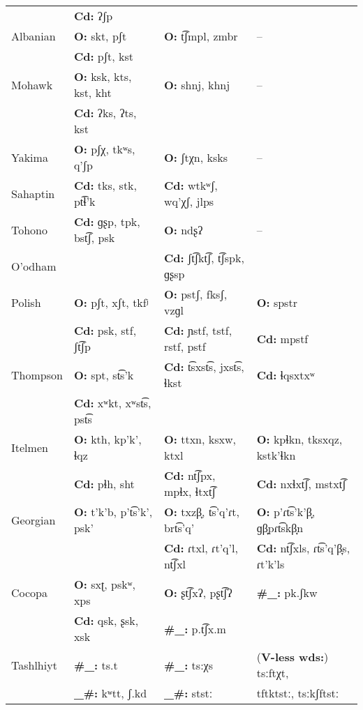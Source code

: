 {\begin{longtable}{llll}
            & \textbf{Cd:} ʔʃp\\
{Albanian} & \textbf{O:} skt, pʃt & \textbf{O:} t͡ʃmpl, zmbr & --\\
            & \textbf{Cd:} pʃt, kst  \\
{Mohawk} & \textbf{O:} ksk, kts, kst, kht  & \textbf{O:} shnj, khnj & --\\
            & \textbf{Cd:} ʔks, ʔts, kst \\
{Yakima} & \textbf{O:} pʃχ, tkʷs, q’ʃp  & \textbf{O:} ʃtχn, ksks   & --\\
Sahaptin &  \textbf{Cd:} tks, stk, pt͡ɬ’k & \textbf{Cd:} wtkʷʃ, wq’χʃ, jlps\\\tablevspace
{Tohono} & \textbf{Cd:} ɡʂp, tpk, bst͡ʃ, psk & \textbf{O:} ndʂʔ & --\\
O’odham & & \textbf{Cd:} ʃt͡ʃkt͡ʃ, t͡ʃspk, ɡʂsp\\\tablevspace
{Polish} & \textbf{O:} pʃt, xʃt, tkfʲ  & \textbf{O:} pstʃ, fksʃ, vzɡl  & \textbf{O:} spstr \\
            & \textbf{Cd:} psk, stf, ʃt͡ʃp & \textbf{Cd:} ɲstf, tstf, rstf, pstf & \textbf{Cd:} mpstf\\
{Thompson} & \textbf{O:} spt, st͡s’k  & \textbf{Cd:} t͡sxst͡s, jxst͡s, ɬkst & \textbf{Cd:} ɬqsxtxʷ\\
           & \textbf{Cd:} xʷkt, xʷst͡s, pst͡s\\
{Itelmen} & \textbf{O:} kth, kp'k', ɬqz  & \textbf{O:} ttxn, ksxw, ktxl  & \textbf{O:} kpɬkn, tksxqz, kstk’ɬkn \\
            & \textbf{Cd:} pɬh, sht & \textbf{Cd:} nt͡ʃpx, mpɬx, ɬtxt͡ʃ & \textbf{Cd:} nxɬxt͡ʃ, mstxt͡ʃ\\
{Georgian} & \textbf{O:} t'k'b, p't͡s'k', psk’ & \textbf{O:} txzβ̞, t͡s’q’ɾt, brt͡s'q{}'  & \textbf{O:} p’ɾt͡s’k’β̞, ɡβ̞pɾt͡skβ̞n \\
            & & \textbf{Cd:} ɾtxl, ɾt'q'l, nt͡ʃxl & \textbf{Cd:} nt͡ʃxls, ɾt͡s’q’β̞s, ɾt'k'ls\\
{Cocopa} & \textbf{O:} sxʈ, pskʷ, xps  & \textbf{O:} ʂt͡ʃxʔ, pʂt͡ʃʔ& \textbf{\#\_:} pk.ʃkw\\
            & \textbf{Cd:} qsk, ʂsk, xsk  & \textbf{\#\_:} p.t͡ʃx.m \\
{Tashlhiyt} & \textbf{\#\_:} ts.t  & \textbf{\#\_:} ts:χs  & (\textbf{V-less wds:}) tsːftχt,\\
            & \textbf{\_\#:} kʷtt, ʃ.kd & \textbf{\_\#:} ststː & \hspace{2em} tftktstː, tsːkʃftstː\\ 
\end{longtable}}

